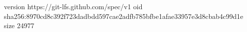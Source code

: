 version https://git-lfs.github.com/spec/v1
oid sha256:8970cd8c392f723dadbdd597cae2adfb785bfbe1afae33957e3d8cbab4c99d1e
size 24977

